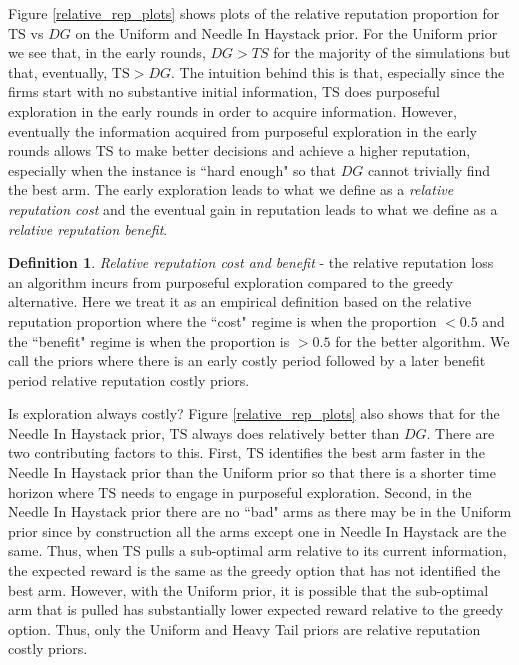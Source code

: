 \documentclass[letterpaper]{article}
\theoremstyle{definition}
\newtheorem{definition}{Definition}
\newcommand{\TS}{\mathrm{TS}}
\begin{document}
Figure \ref{relative_rep_plots} shows plots of the relative reputation proportion for $\TS$ vs $DG$ on the Uniform and Needle In Haystack prior. For the Uniform prior we see that, in the early rounds, $DG > TS$ for the majority of the simulations but that, eventually, $\TS > DG$. The intuition behind this is that, especially since the firms start with no substantive initial information, $\TS$ does purposeful exploration in the early rounds in order to acquire information. However, eventually the information acquired from purposeful exploration in the early rounds allows $\TS$ to make better decisions and achieve a higher reputation, especially when the instance is ``hard enough" so that $DG$ cannot trivially find the best arm. The early exploration leads to what we define as a \textit{relative reputation cost} and the eventual gain in reputation leads to what we define as a \textit{relative reputation benefit}.



\begin{definition}
\textit{Relative reputation cost and benefit} - the relative reputation loss an algorithm incurs from purposeful exploration compared to the greedy alternative. Here we treat it as an empirical definition based on the relative reputation proportion where the ``cost" regime is when the proportion $< 0.5$ and the ``benefit" regime is when the proportion is $> 0.5$ for the better algorithm. We call the priors where there is an early costly period followed by a later benefit period relative reputation costly priors.
\end{definition}
Is exploration always costly? Figure \ref{relative_rep_plots} also shows that for the Needle In Haystack prior, $\TS$ always does relatively better than $DG$. There are two contributing factors to this. First, $\TS$ identifies the best arm faster in the Needle In Haystack prior than the Uniform prior so that there is a shorter time horizon where $\TS$ needs to engage in purposeful exploration. Second, in the Needle In Haystack prior there are no ``bad" arms as there may be in the Uniform prior since by construction all the arms except one in Needle In Haystack are the same. Thus, when $\TS$ pulls a sub-optimal arm relative to its current information, the expected reward is the same as the greedy option that has not identified the best arm. However, with the Uniform prior, it is possible that the sub-optimal arm that is pulled has substantially lower expected reward relative to the greedy option. Thus, only the Uniform and Heavy Tail priors are relative reputation costly priors.
\end{document}
